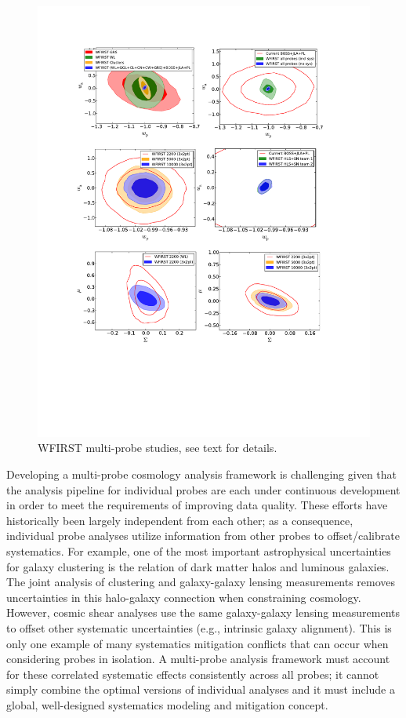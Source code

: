 \label{sec:multi-probe}
\begin{figure}
\includegraphics[width=15cm]{Plots/forecasts/multi}
\caption{WFIRST multi-probe studies, see text for details.}
         \label{fi:multi}
\end{figure}

Developing a multi-probe cosmology analysis framework is challenging given that the analysis pipeline for individual probes are each under continuous development in order to meet the requirements of improving data quality. These efforts have historically been largely independent from each other; as a consequence, individual probe analyses utilize information from other probes to offset/calibrate systematics. 
For example, one of the most important astrophysical uncertainties for galaxy clustering is the relation of dark matter halos and luminous galaxies. The joint analysis of clustering and galaxy-galaxy lensing measurements removes uncertainties in this halo-galaxy connection when constraining cosmology. However, cosmic shear analyses use the same galaxy-galaxy lensing measurements to offset other systematic uncertainties (e.g., intrinsic galaxy alignment). This is only one example of many systematics mitigation conflicts that can occur when considering probes in isolation. A multi-probe analysis framework must account for these correlated systematic effects consistently across all probes; it cannot simply combine the optimal versions of individual analyses and it must include a global, well-designed systematics modeling and mitigation concept.

